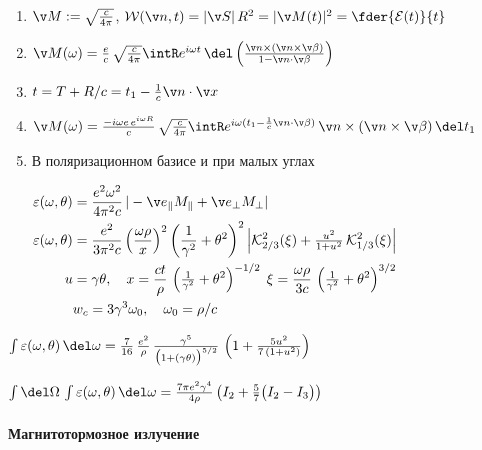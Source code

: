 \documentclass{trchesh}
\begin{document}
\begin{multicols*}{3}
\begin{enumerate}
  \item $\v M := \sqrt{c \over 4\pi}$, $\mathcal W(\v n, t) = |\v S|\, R^2 = |\v M(t)|^2 =
    \fder{\mathcal E(t)}{t}$
  \item $\v M(\omega) = \frac{e}{c} \, \sqrt{c \over 4\pi} \intR e^{i \omega t} \,\del
    \left(\frac{\v n \times (\v n \times \v \beta)}{1 - \v n \cdot \v \beta}\right)$
  \item $t = T + R/c = t_1 - \frac 1c \v n\cdot \v x$
  \item $\v M(\omega) = \frac{-i\omega e\, e^{i \omega R}}{c} \, \sqrt{c \over 4\pi} \* 
     \intR e^{i \omega (t_1 - \frac 1c \v n \cdot \v \beta)} \,
  \v n \times (\v n \times \v \beta)\, \del t_1$
  \item В поляризационном базисе и при малых углах
    \begin{small}
      $
      \begin{aligned}
        \varepsilon (\omega, \theta) &= \frac{e^2 \omega^2}{4\pi^2 c}\,|-\v e_\parallel M_\parallel + \v e_\perp M_\perp|\\
        \varepsilon (\omega, \theta) &= \frac{e^2}{3\pi^2 c} \*
        \left(\frac{\omega \rho}{x}\right)^2 \* \left(\frac 1{\gamma^2} + \theta^2 \right)^2\*
        \left\lvert \mathcal K_{2/3}^2 (\xi) + \tfrac{u^2}{1+u^2}\, \mathcal K_{1/3}^2 (\xi)\right\rvert\\
        u &= \gamma \theta, \quad
        x = \frac{ct}{\rho} \, \left(\tfrac{1}{\gamma^2} + \theta^2\right)^{-1/2} \;
        \xi = \frac{\omega \rho}{3c}\, \left(\tfrac{1}{\gamma^2} + \theta^2\right)^{3/2} \\
        & w_c = 3 \gamma^3 \omega_0,\quad \omega_0 = \rho/c
      \end{aligned}
      $
    \end{small}
\end{enumerate}

$\int \varepsilon(\omega, \theta) \, \del \omega = \frac{7}{16} \, \frac{e^2}{\rho} \, 
\frac{\gamma^5}{\bigl(1 + (\gamma \theta)\bigr)^{5/2}} \, \left( 1 + \frac{5 u^2}{7\,(1+u^2)}\right)$

$\int \del \Omega \, \int \varepsilon (\omega,\theta) \, \del \omega 
= \frac{7 \pi e^2 \gamma^4}{4 \rho} \left(I_2 + \frac 57\bigl(I_2 - I_3\bigr)\right)$

\paragraph{Магнитотормозное излучение}
\underdev \flame


\end{multicols*}
\end{document}
